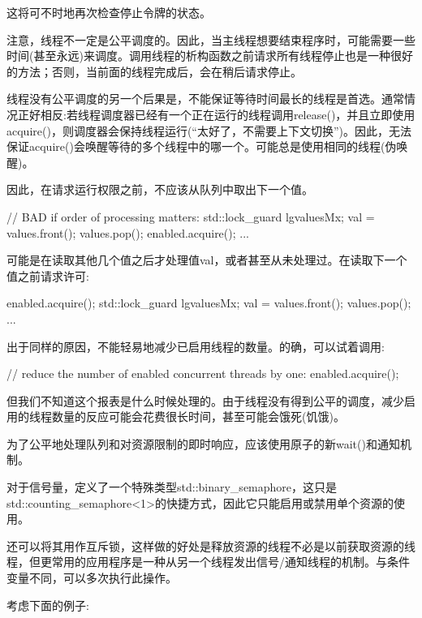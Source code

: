 这将可不时地再次检查停止令牌的状态。


注意，线程不一定是公平调度的。因此，当主线程想要结束程序时，可能需要一些时间(甚至永远)来调度。调用线程的析构函数之前请求所有线程停止也是一种很好的方法；否则，当前面的线程完成后，会在稍后请求停止。

线程没有公平调度的另一个后果是，不能保证等待时间最长的线程是首选。通常情况正好相反:若线程调度器已经有一个正在运行的线程调用release()，并且立即使用acquire()，则调度器会保持线程运行(“太好了，不需要上下文切换”)。因此，无法保证acquire()会唤醒等待的多个线程中的哪一个。可能总是使用相同的线程(伪唤醒)。

因此，在请求运行权限之前，不应该从队列中取出下一个值。

\begin{cpp}
// BAD if order of processing matters:
{
	std::lock_guard lg{valuesMx};
	val = values.front();
	values.pop();
}
enabled.acquire();
...
\end{cpp}

可能是在读取其他几个值之后才处理值val，或者甚至从未处理过。在读取下一个值之前请求许可:

\begin{cpp}
enabled.acquire();
{
	std::lock_guard lg{valuesMx};
	val = values.front();
	values.pop();
}
...
\end{cpp}

出于同样的原因，不能轻易地减少已启用线程的数量。的确，可以试着调用:

\begin{cpp}
// reduce the number of enabled concurrent threads by one:
enabled.acquire();
\end{cpp}

但我们不知道这个报表是什么时候处理的。由于线程没有得到公平的调度，减少启用的线程数量的反应可能会花费很长时间，甚至可能会饿死(饥饿)。

为了公平地处理队列和对资源限制的即时响应，应该使用原子的新wait()和通知机制。


对于信号量，定义了一个特殊类型std::binary\_semaphore，这只是std::counting\_semaphore<1>的快捷方式，因此它只能启用或禁用单个资源的使用。

还可以将其用作互斥锁，这样做的好处是释放资源的线程不必是以前获取资源的线程，但更常用的应用程序是一种从另一个线程发出信号/通知线程的机制。与条件变量不同，可以多次执行此操作。

考虑下面的例子:

